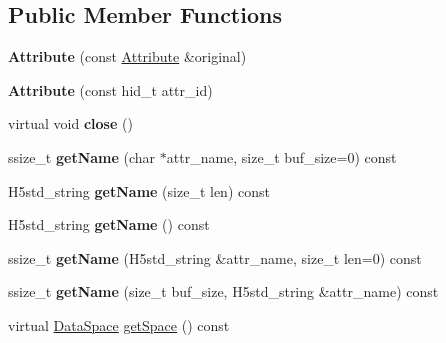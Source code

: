\subsection*{Public Member Functions}
\begin{DoxyCompactItemize}
\item 
\mbox{\label{class_h5_1_1_attribute_ab93ec0beebebfa3a204f4ff8e16be985}} 
{\bfseries Attribute} (const \hyperlink{class_h5_1_1_attribute}{Attribute} \&original)
\item 
\mbox{\label{class_h5_1_1_attribute_afad0e7bbf53e568c8849f23b2478c08c}} 
{\bfseries Attribute} (const hid\+\_\+t attr\+\_\+id)
\item 
\mbox{\label{class_h5_1_1_attribute_ad5e930e6b2e70122209f128da9e444df}} 
virtual void {\bfseries close} ()
\item 
\mbox{\label{class_h5_1_1_attribute_a43dac14905f7d25d108516a9997205b3}} 
ssize\+\_\+t {\bfseries get\+Name} (char $\ast$attr\+\_\+name, size\+\_\+t buf\+\_\+size=0) const
\item 
\mbox{\label{class_h5_1_1_attribute_a9bab45c794bf86ea9f18f89eee68eb6e}} 
H5std\+\_\+string {\bfseries get\+Name} (size\+\_\+t len) const
\item 
\mbox{\label{class_h5_1_1_attribute_a9be026c140282deb12319435223f3dc5}} 
H5std\+\_\+string {\bfseries get\+Name} () const
\item 
\mbox{\label{class_h5_1_1_attribute_a9a06b563966ad36df1ddd878b4d310c6}} 
ssize\+\_\+t {\bfseries get\+Name} (H5std\+\_\+string \&attr\+\_\+name, size\+\_\+t len=0) const
\item 
\mbox{\label{class_h5_1_1_attribute_a0aaf951321adb3f71f6aae3a220b3124}} 
ssize\+\_\+t {\bfseries get\+Name} (size\+\_\+t buf\+\_\+size, H5std\+\_\+string \&attr\+\_\+name) const
\item 
\mbox{\label{class_h5_1_1_attribute_a479ef820dff6212478b8480e15795def}} 
virtual \hyperlink{class_h5_1_1_data_space}{Data\+Space} \hyperlink{class_h5_1_1_attribute_a479ef820dff6212478b8480e15795def}{get\+Space} () const

\end{DoxyCompactItemize}
